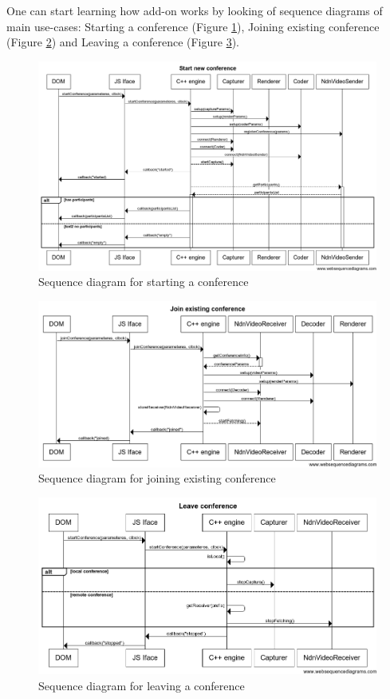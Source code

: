 \documentclass[12pt]{article}
\begin{document}
One can start learning how add-on works by looking of sequence diagrams of main use-cases: Starting a conference (Figure \ref{fig:start}), Joining existing conference (Figure \ref{fig:join}) and Leaving a conference (Figure \ref{fig:leave}).

\begin{figure}
\centering
\includegraphics[width=\textwidth]{../res/graphics/start-seq}
\caption{Sequence diagram for starting a conference}
\label{fig:start}
\end{figure}

\begin{figure}
\centering
\includegraphics[width=\textwidth]{../res/graphics/join-seq}
\caption{Sequence diagram for joining existing conference}
\label{fig:join}
\end{figure}

\begin{figure}
\centering
\includegraphics[width=\textwidth]{../res/graphics/leave-seq}
\caption{Sequence diagram for leaving a conference}
\label{fig:leave}
\end{figure}
\end{document}
